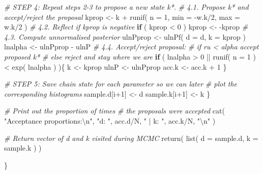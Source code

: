 \documentclass[
]{article}
\newenvironment{Shaded}{\begin{snugshade}}{\end{snugshade}}
\newcommand{\AttributeTok}[1]{\textcolor[rgb]{0.77,0.63,0.00}{#1}}
\newcommand{\CommentTok}[1]{\textcolor[rgb]{0.56,0.35,0.01}{\textit{#1}}}
\newcommand{\ControlFlowTok}[1]{\textcolor[rgb]{0.13,0.29,0.53}{\textbf{#1}}}
\newcommand{\DecValTok}[1]{\textcolor[rgb]{0.00,0.00,0.81}{#1}}
\newcommand{\FunctionTok}[1]{\textcolor[rgb]{0.00,0.00,0.00}{#1}}
\newcommand{\NormalTok}[1]{#1}
\newcommand{\OtherTok}[1]{\textcolor[rgb]{0.56,0.35,0.01}{#1}}
\newcommand{\SpecialCharTok}[1]{\textcolor[rgb]{0.00,0.00,0.00}{#1}}
\newcommand{\StringTok}[1]{\textcolor[rgb]{0.31,0.60,0.02}{#1}}
\begin{document}
\begin{Shaded}
\begin{Highlighting}[]
    \CommentTok{\# STEP 4: Repeat steps 2{-}3 to propose a new state k*.}
    \CommentTok{\# 4.1. Propose k* and accept/reject the proposal}
\NormalTok{    kprop }\OtherTok{\textless{}{-}}\NormalTok{ k }\SpecialCharTok{+} \FunctionTok{runif}\NormalTok{( }\AttributeTok{n =} \DecValTok{1}\NormalTok{, }\AttributeTok{min =} \SpecialCharTok{{-}}\NormalTok{w.k}\SpecialCharTok{/}\DecValTok{2}\NormalTok{, }\AttributeTok{max =}\NormalTok{ w.k}\SpecialCharTok{/}\DecValTok{2}\NormalTok{ )}
    \CommentTok{\# 4.2. Reflect if kprop is negative}
    \ControlFlowTok{if}\NormalTok{ ( kprop }\SpecialCharTok{\textless{}} \DecValTok{0}\NormalTok{ ) kprop }\OtherTok{\textless{}{-}} \SpecialCharTok{{-}}\NormalTok{kprop}
    \CommentTok{\# 4.3. Compute unnormalised posterior}
\NormalTok{    ulnPprop }\OtherTok{\textless{}{-}} \FunctionTok{ulnPf}\NormalTok{( }\AttributeTok{d =}\NormalTok{ d, }\AttributeTok{k =}\NormalTok{ kprop )}
\NormalTok{    lnalpha  }\OtherTok{\textless{}{-}}\NormalTok{ ulnPprop }\SpecialCharTok{{-}}\NormalTok{ ulnP}
    \CommentTok{\# 4.4. Accept/reject proposal:}
    \CommentTok{\#          if ru \textless{} alpha accept proposed k*}
    \CommentTok{\#          else reject and stay where we are}
    \ControlFlowTok{if}\NormalTok{ ( lnalpha }\SpecialCharTok{\textgreater{}} \DecValTok{0} \SpecialCharTok{||} \FunctionTok{runif}\NormalTok{( }\AttributeTok{n =} \DecValTok{1}\NormalTok{ ) }\SpecialCharTok{\textless{}} \FunctionTok{exp}\NormalTok{( lnalpha ) )\{}
\NormalTok{      k     }\OtherTok{\textless{}{-}}\NormalTok{ kprop}
\NormalTok{      ulnP  }\OtherTok{\textless{}{-}}\NormalTok{ ulnPprop}
\NormalTok{      acc.k }\OtherTok{\textless{}{-}}\NormalTok{ acc.k }\SpecialCharTok{+} \DecValTok{1}
\NormalTok{    \}}

    \CommentTok{\# STEP 5: Save chain state for each parameter so we can later}
    \CommentTok{\#         plot the corresponding histograms}
\NormalTok{    sample.d[i}\SpecialCharTok{+}\DecValTok{1}\NormalTok{] }\OtherTok{\textless{}{-}}\NormalTok{ d}
\NormalTok{    sample.k[i}\SpecialCharTok{+}\DecValTok{1}\NormalTok{] }\OtherTok{\textless{}{-}}\NormalTok{ k}
\NormalTok{  \}}

  \CommentTok{\# Print out the proportion of times}
  \CommentTok{\# the proposals were accepted}
  \FunctionTok{cat}\NormalTok{( }\StringTok{"Acceptance proportions:}\SpecialCharTok{\textbackslash{}n}\StringTok{"}\NormalTok{, }\StringTok{"d: "}\NormalTok{, acc.d}\SpecialCharTok{/}\NormalTok{N, }\StringTok{" | k: "}\NormalTok{, acc.k}\SpecialCharTok{/}\NormalTok{N, }\StringTok{"}\SpecialCharTok{\textbackslash{}n}\StringTok{"}\NormalTok{ )}

  \CommentTok{\# Return vector of d and k visited during MCMC}
  \FunctionTok{return}\NormalTok{( }\FunctionTok{list}\NormalTok{( }\AttributeTok{d =}\NormalTok{ sample.d, }\AttributeTok{k =}\NormalTok{ sample.k ) )}

\NormalTok{\}}
\end{Highlighting}
\end{Shaded}
\end{document}
